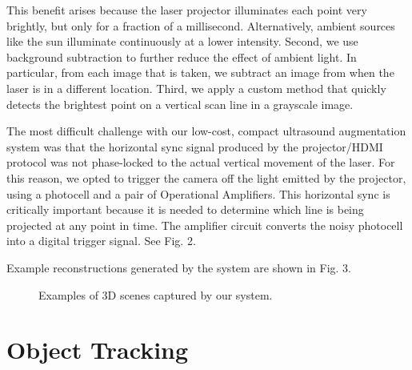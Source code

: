 \documentclass{llncs}
\begin{document}
This benefit arises because the laser projector illuminates each point very brightly, but only for a fraction of a millisecond. Alternatively, ambient sources like the sun illuminate continuously at a lower intensity. Second, we use background subtraction to further reduce the effect of ambient light. In particular, from each image that is taken, we subtract an image from when the laser is in a different location.  Third, we apply a custom method that quickly detects the brightest point on a vertical scan line in a grayscale image.

The most difficult challenge with our low-cost, compact ultrasound augmentation system was that the horizontal sync signal produced by the projector/HDMI protocol was not phase-locked to the actual vertical movement of the laser. For this reason, we opted to trigger the camera off the light emitted by the projector, using a photocell and a pair of Operational Amplifiers.  
This horizontal sync is critically important because it is needed to determine which line is being projected at any point in time.  The amplifier circuit converts the noisy photocell into a digital trigger signal.  See Fig. 2.

Example reconstructions generated by the system are shown in Fig. 3.

\begin{figure}[h]
\centering
{}\hfill%
\caption{
Examples of 3D scenes captured by our system.
}
\end{figure}

\section{Object Tracking}
\end{document}
